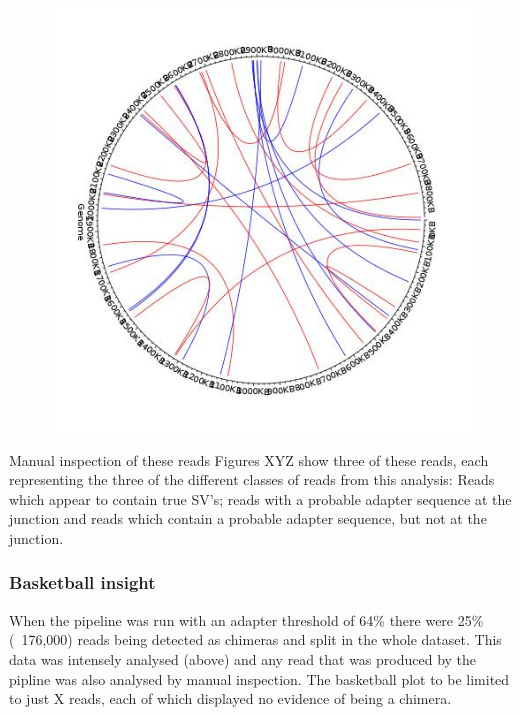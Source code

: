 \begin{figure}[h!]
\centering
\includegraphics[width=\textwidth{}]{Chapter_2/UK54_new_basketball.jpeg}
\caption{  }
\label{fig:UK54_new_basket}
\end{figure}
 
 Manual inspection of these reads
 Figures XYZ show three of these reads, each representing the three of the different classes of reads from this analysis: Reads which appear to contain true SV's; reads with a probable adapter sequence at the junction and reads which contain a probable adapter sequence, but not at the junction.

\subsubsection{Basketball insight}
When the pipeline was run with an adapter threshold of 64\% there were 25\% (~176,000) reads being detected as chimeras and split in the whole dataset. This data was intensely analysed (above) and any read that was produced by the pipline was also analysed by manual inspection.  The basketball plot to be limited to just X reads, each of which displayed no evidence of being a chimera.




